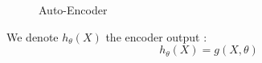 \begin{figure}[!h]
  \centering
  \caption{Auto-Encoder}
  \label{fig:autoenc}
\end{figure}
We denote $h_\theta(X)$ the encoder output : 
\begin{equation}\label{eq:h}
  h_\theta(X) = g(X,\theta)
\end{equation}
